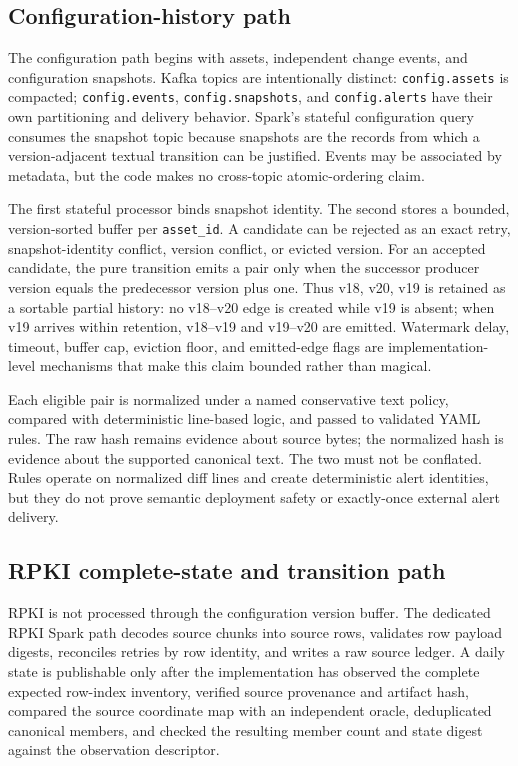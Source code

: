\subsection{Configuration-history path}

The configuration path begins with assets, independent change events, and configuration snapshots. Kafka topics are intentionally distinct: \texttt{config.assets} is compacted; \texttt{config.events}, \texttt{config.snapshots}, and \texttt{config.alerts} have their own partitioning and delivery behavior. Spark's stateful configuration query consumes the snapshot topic because snapshots are the records from which a version-adjacent textual transition can be justified. Events may be associated by metadata, but the code makes no cross-topic atomic-ordering claim.

The first stateful processor binds snapshot identity. The second stores a bounded, version-sorted buffer per \texttt{asset\_id}. A candidate can be rejected as an exact retry, snapshot-identity conflict, version conflict, or evicted version. For an accepted candidate, the pure transition emits a pair only when the successor producer version equals the predecessor version plus one. Thus v18, v20, v19 is retained as a sortable partial history: no v18--v20 edge is created while v19 is absent; when v19 arrives within retention, v18--v19 and v19--v20 are emitted. Watermark delay, timeout, buffer cap, eviction floor, and emitted-edge flags are implementation-level mechanisms that make this claim bounded rather than magical.

Each eligible pair is normalized under a named conservative text policy, compared with deterministic line-based logic, and passed to validated YAML rules. The raw hash remains evidence about source bytes; the normalized hash is evidence about the supported canonical text. The two must not be conflated. Rules operate on normalized diff lines and create deterministic alert identities, but they do not prove semantic deployment safety or exactly-once external alert delivery.

\subsection{RPKI complete-state and transition path}

RPKI is not processed through the configuration version buffer. The dedicated RPKI Spark path decodes source chunks into source rows, validates row payload digests, reconciles retries by row identity, and writes a raw source ledger. A daily state is publishable only after the implementation has observed the complete expected row-index inventory, verified source provenance and artifact hash, compared the source coordinate map with an independent oracle, deduplicated canonical members, and checked the resulting member count and state digest against the observation descriptor.

